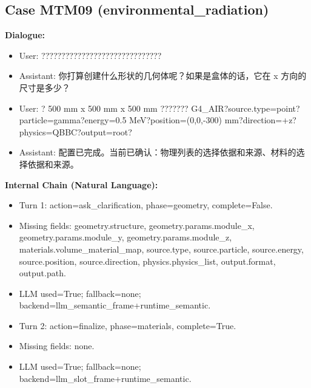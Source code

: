 \documentclass[11pt]{ctexart}
\begin{document}
\subsection{Case MTM09 (environmental\_radiation)}
\textbf{Dialogue:}
\begin{itemize}
\item User: ??????????????????????????????
\item Assistant: 你打算创建什么形状的几何体呢？如果是盒体的话，它在 x 方向的尺寸是多少？
\item User: ? 500 mm x 500 mm x 500 mm ??????? G4\_AIR?source.type=point?particle=gamma?energy=0.5 MeV?position=(0,0,-300) mm?direction=+z?physics=QBBC?output=root?
\item Assistant: 配置已完成。当前已确认：物理列表的选择依据和来源、材料的选择依据和来源。
\end{itemize}
\textbf{Internal Chain (Natural Language):}
\begin{itemize}
\item Turn 1: action=ask\_clarification, phase=geometry, complete=False.
\item Missing fields: geometry.structure, geometry.params.module\_x, geometry.params.module\_y, geometry.params.module\_z, materials.volume\_material\_map, source.type, source.particle, source.energy, source.position, source.direction, physics.physics\_list, output.format, output.path.
\item LLM used=True; fallback=none; backend=llm\_semantic\_frame+runtime\_semantic.
\item Turn 2: action=finalize, phase=materials, complete=True.
\item Missing fields: none.
\item LLM used=True; fallback=none; backend=llm\_slot\_frame+runtime\_semantic.
\end{itemize}
\end{document}
